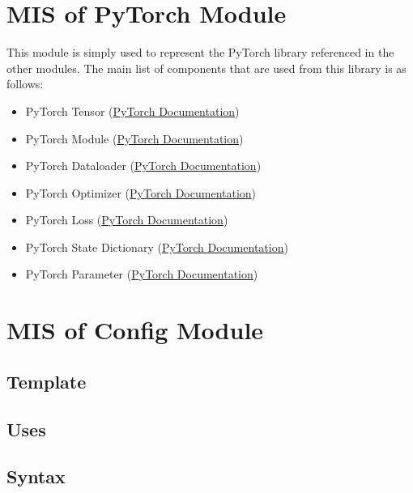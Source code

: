 \documentclass[12pt, titlepage]{article}
\begin{document}
\section{MIS of PyTorch Module} \label{ModuleTorch} 
This module is simply used to represent the PyTorch library referenced in the other modules.
The main list of components that are used from this library is as follows:
\begin{itemize}
  \item PyTorch Tensor (\href{https://pytorch.org/docs/stable/tensors.html}{PyTorch Documentation})
  \item PyTorch Module (\href{https://pytorch.org/docs/stable/generated/torch.nn.Module.html}{PyTorch Documentation})
  \item PyTorch Dataloader (\href{https://pytorch.org/tutorials/beginner/basics/data_tutorial.html}{PyTorch Documentation})
  \item PyTorch Optimizer (\href{https://pytorch.org/docs/stable/optim.html}{PyTorch Documentation})
  \item PyTorch Loss (\href{https://pytorch.org/docs/stable/nn.html#loss-functions}{PyTorch Documentation})
  \item PyTorch State Dictionary (\href{https://pytorch.org/tutorials/beginner/saving_loading_models.html}{PyTorch Documentation})
  \item PyTorch Parameter (\href{https://pytorch.org/docs/stable/generated/torch.nn.parameter.Parameter.html}{PyTorch Documentation})
\end{itemize}

\newpage

\section{MIS of Config Module} \label{ModuleCfg} 

\subsection{Template}



\subsection{Uses}


\subsection{Syntax}
\end{document}
